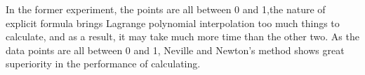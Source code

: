 \documentclass[12pt]{article}
\begin{document}
\begin{figure}[!h]
    \centering
    
\end{figure}

In the former experiment, the points are all between 0 and 1,the nature of explicit formula brings Lagrange polynomial interpolation too much things to calculate, and as a result, it may take much more time than the other two. As the data points are all between 0 and 1, Neville and Newton's method shows great superiority in the performance of calculating.
\end{document}
